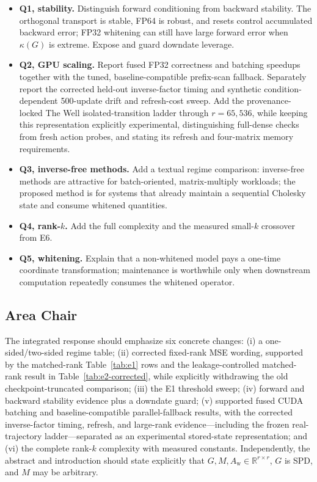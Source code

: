\documentclass[11pt]{article}
\newcommand{\Aw}{A_{\mathrm w}}
\newcommand{\R}{\mathbb{R}}
\begin{document}
\begin{itemize}
  \item \textbf{Q1, stability.} Distinguish forward conditioning from
  backward stability.  The orthogonal transport is stable, FP64 is robust,
  and resets control accumulated backward error; FP32 whitening can still
  have large forward error when \(\kappa(G)\) is extreme.  Expose and guard
  downdate leverage.
  \item \textbf{Q2, GPU scaling.} Report fused FP32 correctness and batching
  speedups together with the tuned, baseline-compatible prefix-scan fallback.
  Separately report the corrected held-out inverse-factor timing and synthetic
  condition-dependent 500-update drift and refresh-cost sweep.  Add the
  provenance-locked The Well isolated-transition ladder through
  \(r=65{,}536\), while keeping this representation explicitly experimental,
  distinguishing full-dense checks from fresh action probes, and stating its
  refresh and four-matrix memory requirements.
  \item \textbf{Q3, inverse-free methods.} Add a textual regime comparison:
  inverse-free methods are attractive for batch-oriented, matrix-multiply
  workloads; the proposed method is for systems that already maintain a
  sequential Cholesky state and consume whitened quantities.
  \item \textbf{Q4, rank-\(k\).} Add the full complexity and the measured
  small-\(k\) crossover from E6.
  \item \textbf{Q5, whitening.} Explain that a non-whitened model pays a
  one-time coordinate transformation; maintenance is worthwhile only when
  downstream computation repeatedly consumes the whitened operator.
\end{itemize}

\subsection{Area Chair}

The integrated response should emphasize six concrete changes:
(i) a one-sided/two-sided regime table;
(ii) corrected fixed-rank MSE wording, supported by the matched-rank
Table~\ref{tab:e1} rows and the leakage-controlled matched-rank result in
Table~\ref{tab:e2-corrected}, while explicitly withdrawing the old
checkpoint-truncated comparison;
(iii) the E1 threshold sweep;
(iv) forward and backward stability evidence plus a downdate guard;
(v) supported fused CUDA batching and baseline-compatible parallel-fallback
results, with the corrected inverse-factor timing, refresh, and large-rank
evidence---including the frozen real-trajectory ladder---separated as an
experimental stored-state representation;
and
(vi) the complete rank-\(k\) complexity with measured constants.
Independently, the abstract and introduction should state explicitly that
\(G,M,\Aw\in\R^{r\times r}\), \(G\) is SPD, and \(M\) may be arbitrary.
\end{document}
